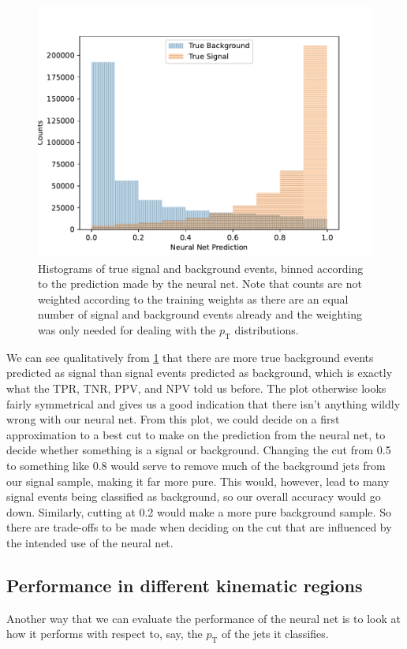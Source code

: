 \documentclass[11pt]{article}
\numberwithin{equation}{section}
\numberwithin{figure}{section}
\numberwithin{table}{section}
\begin{document}
\begin{figure}[h]
    \begin{center}
        \includegraphics[width=.8\textwidth]{Plots/bkg_vs_signal.pdf}
        \caption{Histograms of true signal and background events, binned according to the prediction made by the neural net. Note that counts are not weighted according to the training weights as there are an equal number of signal and background events already and the weighting was only needed for dealing with the $p_\mathrm{T}$ distributions.}
        \label{fig:bkg_vs_signal}
    \end{center}
\end{figure}

We can see qualitatively from \cref{fig:bkg_vs_signal} that there are more true background events predicted as signal than signal events predicted as background, which is exactly what the TPR, TNR, PPV, and NPV told us before. The plot otherwise looks fairly symmetrical and gives us a good indication that there isn't anything wildly wrong with our neural net. From this plot, we could decide on a first approximation to a best cut to make on the prediction from the neural net, to decide whether something is a signal or background. Changing the cut from 0.5 to something like 0.8 would serve to remove much of the background jets from our signal sample, making it far more pure. This would, however, lead to many signal events being classified as background, so our overall accuracy would go down. Similarly, cutting at 0.2 would make a more pure background sample. So there are trade-offs to be made when deciding on the cut that are influenced by the intended use of the neural net.

\subsection{Performance in different kinematic regions}\label{sec:Kinematic_Performance}
Another way that we can evaluate the performance of the neural net is to look at how it performs with respect to, say, the $p_\mathrm{T}$ of the jets it classifies. 
\end{document}
